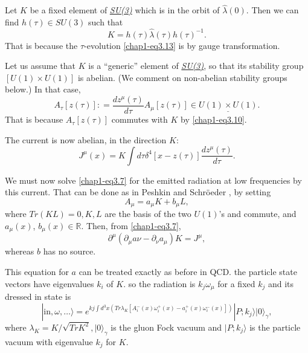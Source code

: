 Let $K$ be a fixed element of \underline{\textit{SU(3)}} which is in the orbit of $\hat{\lambda}(0)$. Then we can find $h (\tau) \in SU(3)$ such that
\begin{equation}
  K= h (\tau) \hat{\lambda} (\tau) h(\tau)^{-1}.\label{chap1-eq3.14}
\end{equation}
That is because the $\tau$-evolution \eqref{chap1-eq3.13} is by gauge transformation.

Let us assume that $K$ is a ``generic'' element of \underline{\textit{SU(3)}}, so that its stability group $[U(1) \times U (1)]$ is abelian. (We comment on non-abelian stability groups below.) In that case,
\begin{equation}
A_\tau [z(\tau)]: = \frac{dz^\mu(\tau)}{d\tau} A_\mu [z(\tau)] \in \underline{U(1) \times U(1)}.\label{chap1-eq3.15}
\end{equation}
That is because $A_\tau [z(\tau)]$ commutes with $K$ by \eqref{chap1-eq3.10}.

The current is now abelian, in the direction $K$:
\begin{equation}
J^\mu (x) = K \int d \tau \delta^4 [x-z(\tau)] \frac{dz^\mu(\tau)}{d\tau}. \label{chap1-eq3.16}
\end{equation}

We must now solve \eqref{chap1-eq3.7} for the emitted radiation at low frequencies by this current. That can be done as in Peshkin and Schr\"oeder \cite{key8}, by setting
\begin{equation}
A_\mu = a_\mu K + b_\mu L, \label{chap1-eq3.17}
\end{equation}
where $Tr (KL)=0, K, L$ are the basis of the two \underline{$U(1)$}'s and commute, and $a_\mu(x)$, $b_\mu(x)\in \mathbb{R}$. Then, from \eqref{chap1-eq3.7},
\begin{equation}
\partial^\mu (\partial_\mu a \nu - \partial_\nu a_\mu) K = J^\mu, \label{chap1-eq3.18}
\end{equation}
whereas $b$ has no source.

This equation for $a$ can be treated exactly as before in QCD. the particle state vectors have eigenvalues $k_i$ of $K$. so the radiation is $k_j \omega_\mu$ for a fixed $k_j$ and its dressed in state is
\begin{equation}
|\text{in}, \omega, \ldots \rangle = e^{kj \int d^3 x (Tr\lambda_K[A_i^- (x) \omega_i^+ (x)- a_i^+ (x) \omega_i^-(x)])} | P; k_j \rangle |0\rangle_\gamma, \label{chap1-eq3.19} 
\end{equation}
where $\lambda_K = K / \sqrt{TrK^2}, |0\rangle_\gamma$ is the gluon Fock vacuum and $|P; k_j \rangle$ is the particle vacuum with eigenvalue $k_j$ for $K$.


